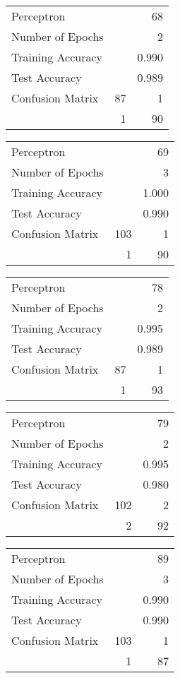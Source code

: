 \documentclass[11pt,twocolumn]{article}
\begin{document}
\begin{center}
\begin{tabular}{l | r r}
Perceptron &&68\\
Number of Epochs & &2\\
Training Accuracy & &0.990\\
Test Accuracy & &0.989\\
Confusion Matrix &87 & 1\\
 &1 & 90\\
\end{tabular}
\end{center}
\begin{center}
\begin{tabular}{l | r r}
Perceptron &&69\\
Number of Epochs & &3\\
Training Accuracy & &1.000\\
Test Accuracy & &0.990\\
Confusion Matrix &103 & 1\\
 &1 & 90\\
\end{tabular}
\end{center}
\begin{center}
\begin{tabular}{l | r r}
Perceptron &&78\\
Number of Epochs & &2\\
Training Accuracy & &0.995\\
Test Accuracy & &0.989\\
Confusion Matrix &87 & 1\\
 &1 & 93\\
\end{tabular}
\end{center}
\begin{center}
\begin{tabular}{l | r r}
Perceptron &&79\\
Number of Epochs & &2\\
Training Accuracy & &0.995\\
Test Accuracy & &0.980\\
Confusion Matrix &102 & 2\\
 &2 & 92\\
\end{tabular}
\end{center}
\begin{center}
\begin{tabular}{l | r r}
Perceptron &&89\\
Number of Epochs & &3\\
Training Accuracy & &0.990\\
Test Accuracy & &0.990\\
Confusion Matrix &103 & 1\\
 &1 & 87\\
\end{tabular}
\end{center}
\end{document}
